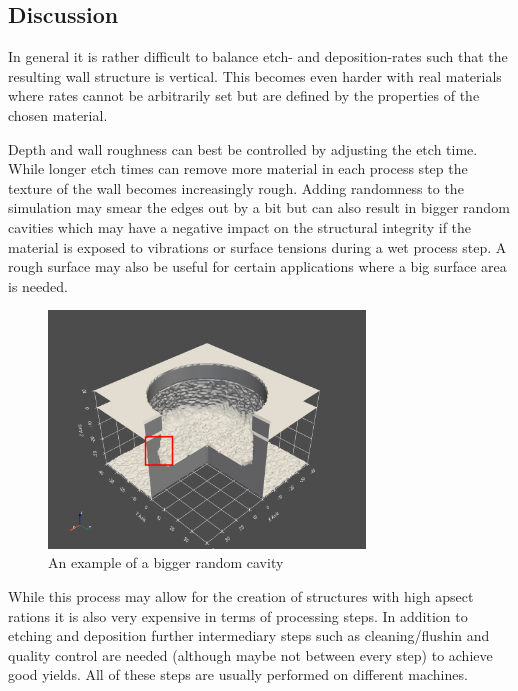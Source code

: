 \subsection{Discussion}
In general it is rather difficult to balance etch- and deposition-rates such that the resulting
wall structure is vertical. This becomes even harder with real materials where rates cannot be arbitrarily set but are defined by the properties of the chosen material.

Depth and wall roughness can best be controlled by adjusting the etch time. While longer etch times can remove more material in each process step the texture of the wall becomes increasingly rough.
Adding randomness to the simulation may smear the edges out by a bit but can also result in bigger random cavities which may have a negative impact on the structural integrity 
if the material is exposed to vibrations or surface tensions during a wet process step.
A rough surface may also be useful for certain applications where a big surface area is needed. 
\begin{figure}[H]
	\centering
	\includegraphics[width=0.75\textwidth]{res/task2.2_cavityBig.png}
	\caption{An example of a bigger random cavity}
\end{figure}

While this process may allow for the creation of structures with high apsect rations it is also very expensive in terms of processing steps.
In addition to etching and deposition further intermediary steps such as cleaning/flushin and quality control are needed (although maybe not between every step)
to achieve good yields. All of these steps are usually performed on different machines.

